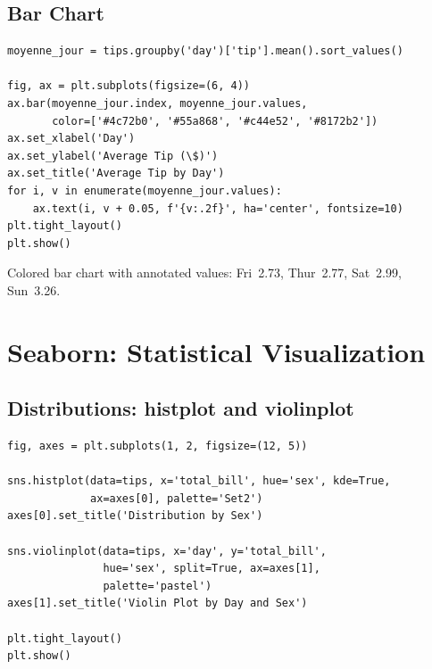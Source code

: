 \subsection{Bar Chart}

\begin{codeblock}[title=\textbf{Python}]
\begin{verbatim}
moyenne_jour = tips.groupby('day')['tip'].mean().sort_values()

fig, ax = plt.subplots(figsize=(6, 4))
ax.bar(moyenne_jour.index, moyenne_jour.values,
       color=['#4c72b0', '#55a868', '#c44e52', '#8172b2'])
ax.set_xlabel('Day')
ax.set_ylabel('Average Tip (\$)')
ax.set_title('Average Tip by Day')
for i, v in enumerate(moyenne_jour.values):
    ax.text(i, v + 0.05, f'{v:.2f}', ha='center', fontsize=10)
plt.tight_layout()
plt.show()
\end{verbatim}
\end{codeblock}

\begin{codeoutput}
Colored bar chart with annotated values: Fri~2.73, Thur~2.77, Sat~2.99, Sun~3.26.
\end{codeoutput}

\section{Seaborn: Statistical Visualization}

\subsection{Distributions: histplot and violinplot}

\begin{codeblock}[title=\textbf{Python}]
\begin{verbatim}
fig, axes = plt.subplots(1, 2, figsize=(12, 5))

sns.histplot(data=tips, x='total_bill', hue='sex', kde=True,
             ax=axes[0], palette='Set2')
axes[0].set_title('Distribution by Sex')

sns.violinplot(data=tips, x='day', y='total_bill',
               hue='sex', split=True, ax=axes[1],
               palette='pastel')
axes[1].set_title('Violin Plot by Day and Sex')

plt.tight_layout()
plt.show()
\end{verbatim}
\end{codeblock}

